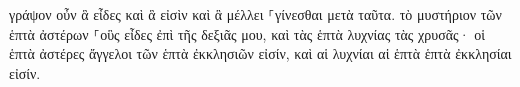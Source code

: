 \documentclass{openreader}
\begin{document}
γράψον οὖν ἃ εἶδες καὶ ἃ εἰσὶν καὶ ἃ μέλλει ⸀γίνεσθαι μετὰ ταῦτα. 
τὸ μυστήριον τῶν ἑπτὰ ἀστέρων ⸀οὓς εἶδες ἐπὶ τῆς δεξιᾶς μου, καὶ τὰς ἑπτὰ λυχνίας τὰς χρυσᾶς· οἱ ἑπτὰ ἀστέρες ἄγγελοι τῶν ἑπτὰ ἐκκλησιῶν εἰσίν, καὶ αἱ λυχνίαι αἱ ἑπτὰ ἑπτὰ ἐκκλησίαι εἰσίν. 
\end{document}
